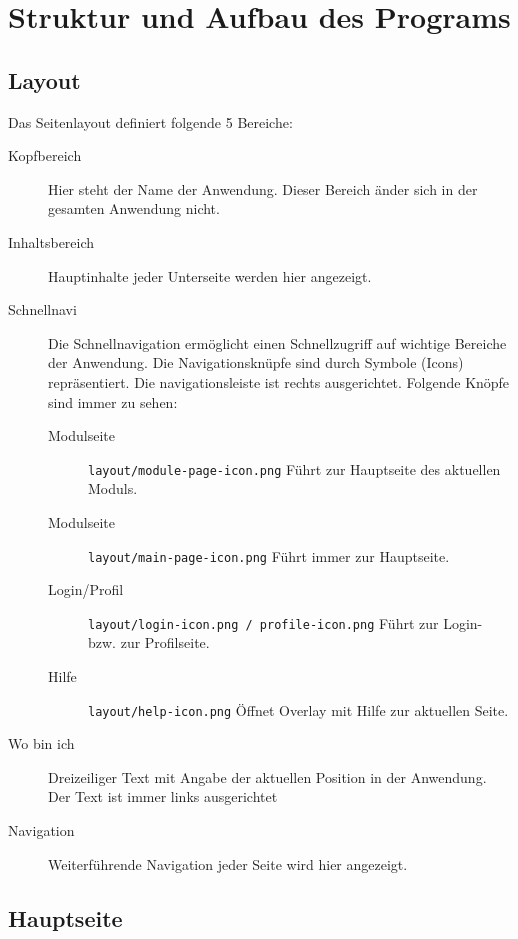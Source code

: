 \chapter{Struktur und Aufbau des Programs}

%
%
%
\section{Layout}
\label{sec:layout}

Das Seitenlayout definiert folgende 5 Bereiche:
\begin{description}
  \item[Kopfbereich] Hier steht der Name der Anwendung. Dieser Bereich änder sich in der gesamten Anwendung nicht.
  \item[Inhaltsbereich] Hauptinhalte jeder Unterseite werden hier angezeigt.
  \item[Schnellnavi] Die Schnellnavigation ermöglicht einen Schnellzugriff auf wichtige Bereiche der Anwendung. Die Navigationsknüpfe sind durch Symbole (Icons) repräsentiert. Die navigationsleiste ist rechts ausgerichtet. Folgende Knöpfe sind immer zu sehen:
  \begin{description}
    \item[Modulseite] \texttt{layout/module-page-icon.png} Führt zur Hauptseite des aktuellen Moduls. 
    \item[Modulseite] \texttt{layout/main-page-icon.png} Führt immer zur Hauptseite. 
    \item[Login/Profil] \texttt{layout/login-icon.png / profile-icon.png} Führt zur Login- bzw. zur Profilseite. 
    \item[Hilfe] \texttt{layout/help-icon.png} Öffnet Overlay mit Hilfe zur aktuellen Seite. 
  \end{description}
  
  \item[Wo bin ich] Dreizeiliger Text mit Angabe der aktuellen Position in der Anwendung. Der Text ist immer links ausgerichtet
  \item[Navigation] Weiterführende Navigation jeder Seite wird hier angezeigt.
\end{description}


%
%
%
\section{Hauptseite}
\label{sec:main-page}

